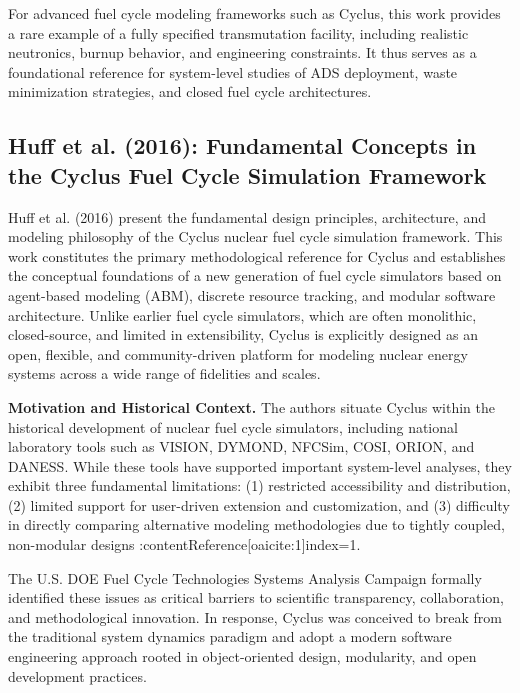 For advanced fuel cycle modeling frameworks such as Cyclus, this work provides a rare example of a fully specified transmutation 
facility, including realistic neutronics, burnup behavior, and engineering constraints. It thus serves as a foundational reference 
for system-level studies of ADS deployment, waste minimization strategies, and closed fuel cycle architectures.


\subsection{Huff et al. (2016): Fundamental Concepts in the Cyclus Fuel Cycle Simulation Framework}
\label{subsec:huff2016}

Huff et al. (2016) present the fundamental design principles, architecture, and modeling philosophy of the Cyclus nuclear fuel 
cycle simulation framework. This work constitutes the primary methodological reference for Cyclus and establishes the conceptual 
foundations of a new generation of fuel cycle simulators based on agent-based modeling (ABM), discrete resource tracking, and 
modular software architecture. Unlike earlier fuel cycle simulators, which are often monolithic, closed-source, and limited in 
extensibility, Cyclus is explicitly designed as an open, flexible, and community-driven platform for modeling nuclear energy systems 
across a wide range of fidelities and scales.

\textbf{Motivation and Historical Context.}  
The authors situate Cyclus within the historical development of nuclear fuel cycle simulators, including national laboratory tools 
such as VISION, DYMOND, NFCSim, COSI, ORION, and DANESS. While these tools have supported important system-level analyses, they 
exhibit three fundamental limitations: (1) restricted accessibility and distribution, (2) limited support for user-driven extension 
and customization, and (3) difficulty in directly comparing alternative modeling methodologies due to tightly coupled, non-modular 
designs :contentReference[oaicite:1]{index=1}.

The U.S. DOE Fuel Cycle Technologies Systems Analysis Campaign formally identified these issues as critical barriers to scientific 
transparency, collaboration, and methodological innovation. In response, Cyclus was conceived to break from the traditional system 
dynamics paradigm and adopt a modern software engineering approach rooted in object-oriented design, modularity, and open 
development practices.

